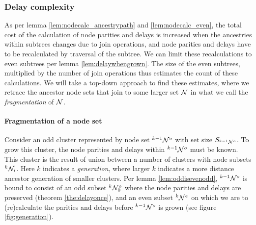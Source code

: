 \subsubsection{Delay complexity}
As per lemma \ref{lem:nodecalc_ancestrypath} and \ref{lem:nodecalc_even}, the total cost of the calculation of node parities and delays is increased when the ancestries within subtrees changes due to join operations, and node parities and delays have to be recalculated by traversal of the subtree. We can limit these recalculations to even subtrees per lemma \ref{lem:delaywhengrown}. The size of the even subtrees, multiplied by the number of join operations thus estimates the count of these calculations. We will take a top-down approach to find these estimates, where we retrace the ancestor node sets that join to some larger set $\mathcal{N}$ in what we call the \emph{fragmentation} of $\mathcal{N}$.

\paragraph{Fragmentation of a node set}
Consider an odd cluster represented by node set ${}^{k-1}\mathcal{N}^o$ with set size $S_{{}^{k-1}\mathcal{N}^o}$. To grow this cluster, the node parities and delays within ${}^{k-1}\mathcal{N}^o$ must be known. This cluster is the result of union between a number of clusters with node subsets ${}^{k}\mathcal{N}_i$. Here $k$ indicates a \emph{generation}, where larger $k$ indicates a more distance ancestor generation of smaller clusters. Per lemma \ref{lem:oddisevenodd}, ${}^{k-1}\mathcal{N}^o$ is bound to consist of an odd subset ${}^{k}\mathcal{N}^o_0$ where the node parities and delays are preserved (theorem \ref{the:delayonce}), and an even subset ${}^{k}\mathcal{N}^e$ on which we are to (re)calculate the parities and delays before ${}^{k-1}\mathcal{N}^o$ is grown (see figure \ref{fig:generation}).

